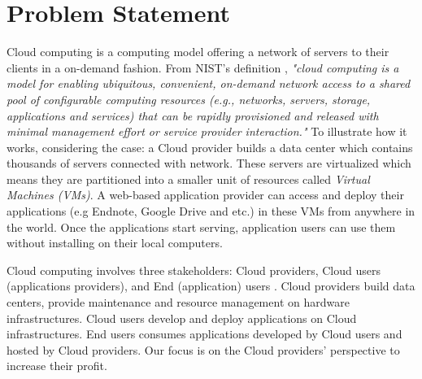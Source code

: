 

\section{Problem Statement}

Cloud computing is a computing model offering a network of servers to their clients in a on-demand fashion. From NIST's definition \cite{Mell:2011jj}, \textit{"cloud computing is a model for enabling ubiquitous, convenient, on-demand network access to a shared pool of configurable computing resources (e.g., networks, servers, storage, applications and services) that can be rapidly provisioned and released with minimal management effort or service provider interaction."} 
To illustrate how it works, considering the case: a Cloud provider builds a data center which contains thousands of servers connected with network. These servers are virtualized which means they are partitioned into a smaller unit of resources called \emph{Virtual Machines (VMs)}. A web-based application provider can access and deploy their applications (e.g Endnote, Google Drive and etc.) in these VMs from anywhere in the world. Once the applications start serving, application users can use them without installing on their local computers.

Cloud computing involves three stakeholders: Cloud providers, Cloud users (applications providers), and End (application) users \cite{Jennings:2015ht}. Cloud providers build data centers, provide maintenance and resource management on hardware infrastructures. Cloud users develop and deploy applications on Cloud infrastructures. End users consumes applications developed by Cloud users and hosted by Cloud providers. Our focus is on the Cloud providers' perspective to increase their profit.



